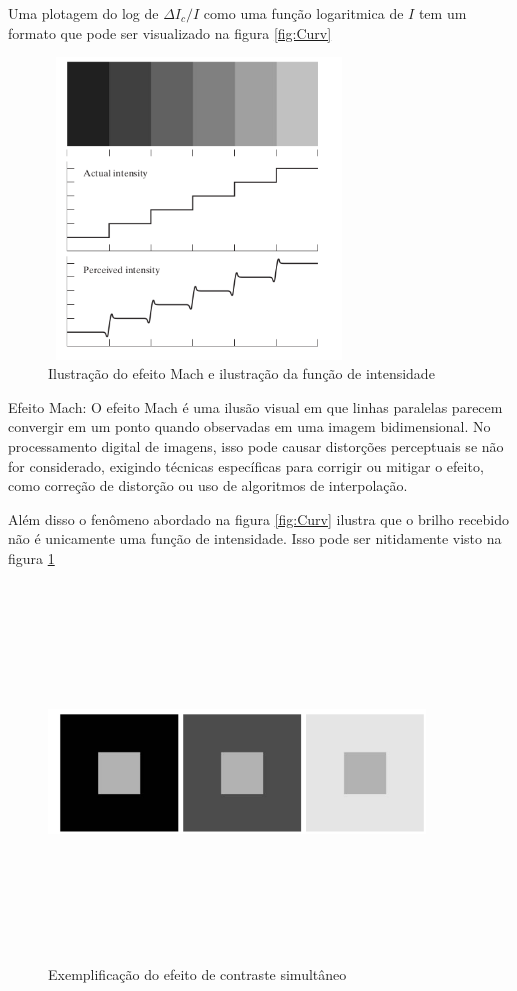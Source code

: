 \documentclass[12pt]{article}
\begin{document}
    Uma plotagem do log de $\varDelta I_{c}/I$ como uma função logaritmica de $I$ tem um formato que pode ser visualizado na
    figura \ref{fig:Curv}

    \begin{figure}[H]
        \centering
        \includegraphics[width=8cm,height=8cm]{images/11.png}
        \caption{Ilustração do efeito Mach e ilustração da função de intensidade}
        \label{fig:mach}
    \end{figure}

    Efeito Mach: O efeito Mach é uma ilusão visual em que linhas paralelas parecem convergir em um ponto quando observadas
    em uma imagem bidimensional. No processamento digital de imagens, isso pode causar distorções perceptuais se não for considerado,
    exigindo técnicas específicas para corrigir ou mitigar o efeito, como correção de distorção ou uso de algoritmos de interpolação.

    Além disso o fenômeno abordado na figura \ref{fig:Curv} ilustra que o brilho recebido não é unicamente uma função de intensidade. Isso pode
    ser nitidamente visto na figura \ref{fig:mach}

    \begin{figure}[H]
        \centering
        \includegraphics[width=10cm,height=10cm]{images/12.png}
        \caption{Exemplificação do efeito de contraste simultâneo}
        \label{fig:Contraste}
    \end{figure}
\end{document}
